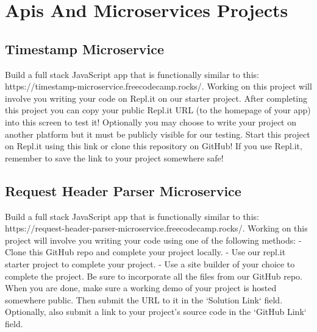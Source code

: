 \documentclass{article}%
\begin{document}
%
\newpage%
\section{Apis And Microservices Projects}%
\label{sec:ApisAndMicroservicesProjects}%
\subsection{Timestamp Microservice}%
\label{subsec:TimestampMicroservice}%
Build a full stack JavaScript app that is functionally similar to this: https://timestamp{-}microservice.freecodecamp.rocks/.\newline%
Working on this project will involve you writing your code on Repl.it on our starter project. After completing this project you can copy your public Repl.it URL (to the homepage of your app) into this screen to test it! Optionally you may choose to write your project on another platform but it must be publicly visible for our testing.\newline%
Start this project on Repl.it using this link or clone this repository on GitHub! If you use Repl.it, remember to save the link to your project somewhere safe!\newline%

%
\subsection{Request Header Parser Microservice}%
\label{subsec:RequestHeaderParserMicroservice}%
Build a full stack JavaScript app that is functionally similar to this: https://request{-}header{-}parser{-}microservice.freecodecamp.rocks/. Working on this project will involve you writing your code using one of the following methods:\newline%
{-} Clone this GitHub repo and complete your project locally.\newline%
{-} Use our repl.it starter project to complete your project.\newline%
{-} Use a site builder of your choice to complete the project. Be sure to incorporate all the files from our GitHub repo.\newline%
When you are done, make sure a working demo of your project is hosted somewhere public. Then submit the URL to it in the `Solution Link` field. Optionally, also submit a link to your project's source code in the `GitHub Link` field.\newline%

%
\end{document}
